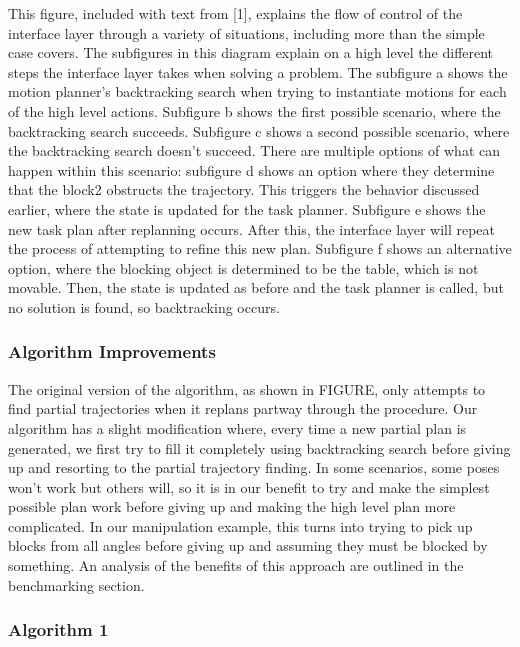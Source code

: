 \documentclass[12pt]{article}
\begin{document}
This figure, included with text from [1], explains the flow of control of the interface layer through a variety of situations, including more than the simple case covers.  
The subfigures in this diagram explain on a high level the different steps the interface layer takes when solving a problem.  
The subfigure a shows the motion planner's backtracking search when trying to instantiate motions for each of the high level actions.  
Subfigure b shows the first possible scenario, where the backtracking search succeeds.  Subfigure c shows a second possible scenario, where the backtracking search doesn't succeed.  
There are multiple options of what can happen within this scenario: subfigure d shows an option where they determine that the block2 obstructs the trajectory.  
This triggers the behavior discussed earlier, where the state is updated for the task planner.  
Subfigure e shows the new task plan after replanning occurs.  
After this, the interface layer will repeat the process of attempting to refine this new plan.  
Subfigure f shows an alternative option, where the blocking object is determined to be the table, which is not movable.  
Then, the state is updated as before and the task planner is called, but no solution is found, so backtracking occurs.

\subsubsection{Algorithm Improvements}

The original version of the algorithm, as shown in FIGURE, only attempts to find partial trajectories when it replans partway through the procedure.  Our algorithm has a slight modification where, every time a new partial plan is generated, we first try to fill it completely using backtracking search before giving up and resorting to the partial trajectory finding.  In some scenarios, some poses won't work but others will, so it is in our benefit to try and make the simplest possible plan work before giving up and making the high level plan more complicated.  In our manipulation example, this turns into trying to pick up blocks from all angles before giving up and assuming they must be blocked by something.  An analysis of the benefits of this approach are outlined in the benchmarking section.  

\subsubsection{Algorithm 1}
\end{document}

